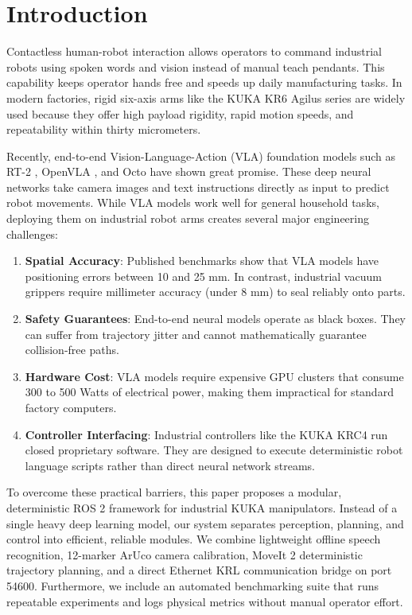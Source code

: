 \documentclass{svproc}
\begin{document}
\section{Introduction}
\label{sec:introduction}

Contactless human-robot interaction allows operators to command industrial robots using spoken words and vision instead of manual teach pendants. This capability keeps operator hands free and speeds up daily manufacturing tasks. In modern factories, rigid six-axis arms like the KUKA KR6 Agilus series are widely used because they offer high payload rigidity, rapid motion speeds, and repeatability within thirty micrometers.

Recently, end-to-end Vision-Language-Action (VLA) foundation models such as RT-2 \cite{rt2_2023}, OpenVLA \cite{openvla2024}, and Octo \cite{octo2024} have shown great promise. These deep neural networks take camera images and text instructions directly as input to predict robot movements. While VLA models work well for general household tasks, deploying them on industrial robot arms creates several major engineering challenges:
\begin{enumerate}
    \item \textbf{Spatial Accuracy}: Published benchmarks show that VLA models have positioning errors between 10 and 25 mm. In contrast, industrial vacuum grippers require millimeter accuracy (under 8 mm) to seal reliably onto parts.
    \item \textbf{Safety Guarantees}: End-to-end neural models operate as black boxes. They can suffer from trajectory jitter and cannot mathematically guarantee collision-free paths.
    \item \textbf{Hardware Cost}: VLA models require expensive GPU clusters that consume 300 to 500 Watts of electrical power, making them impractical for standard factory computers.
    \item \textbf{Controller Interfacing}: Industrial controllers like the KUKA KRC4 \cite{kuka_kss2018} run closed proprietary software. They are designed to execute deterministic robot language scripts rather than direct neural network streams.
\end{enumerate}

To overcome these practical barriers, this paper proposes a modular, deterministic ROS 2 framework for industrial KUKA manipulators. Instead of a single heavy deep learning model, our system separates perception, planning, and control into efficient, reliable modules. We combine lightweight offline speech recognition, 12-marker ArUco camera calibration, MoveIt 2 deterministic trajectory planning, and a direct Ethernet KRL communication bridge on port 54600. Furthermore, we include an automated benchmarking suite that runs repeatable experiments and logs physical metrics without manual operator effort.
\end{document}
